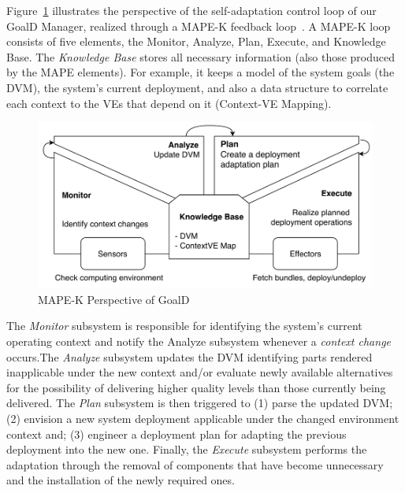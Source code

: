 \documentclass[conference]{IEEEtran}
\begin{document}
Figure~\ref{fig:mapek} illustrates the perspective of the self-adaptation control loop of our GoalD Manager, realized through a MAPE-K feedback loop~\cite{white_architectural_2004}. A MAPE-K loop consists of five elements, the Monitor, Analyze, Plan, Execute, and Knowledge Base. The \emph{Knowledge Base} stores all necessary information (also those produced by the MAPE elements). For example, it keeps a model of the system goals (the DVM), the system's current deployment, and also a data structure to correlate each context to the VEs that depend on it (Context-VE Mapping).
\begin{figure}[t]
  \centering
  \includegraphics[width=0.85\linewidth]{./images/goald_mape_k_high_level}
  \caption{MAPE-K Perspective of GoalD}
\label{fig:mapek}
\end{figure}

The \emph{Monitor} subsystem is responsible for identifying the system's current operating context and notify the Analyze subsystem whenever a \emph{context change} occurs.The \emph{Analyze} subsystem updates the DVM identifying parts rendered inapplicable under the new context and/or evaluate newly available alternatives for the possibility of delivering higher quality levels than those currently being delivered. The \emph{Plan} subsystem is then triggered to (1) parse the updated DVM; (2) envision a new system deployment applicable under the changed environment context and; (3) engineer a deployment plan for adapting the previous deployment into the new one. Finally, the \emph{Execute} subsystem performs the adaptation through the removal of components that have become unnecessary and the installation of the newly required ones.
\end{document}
